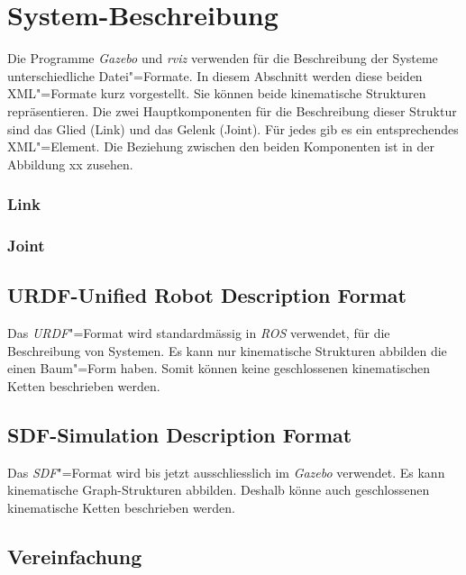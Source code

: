 \section{System-Beschreibung}

Die Programme \textit{Gazebo} und \textit{rviz} verwenden für die Beschreibung der Systeme unterschiedliche Datei"=Formate.
In diesem Abschnitt werden diese beiden XML"=Formate kurz vorgestellt.
Sie können beide kinematische Strukturen repräsentieren.
Die zwei Hauptkomponenten für die Beschreibung dieser Struktur sind das Glied (Link) und das Gelenk (Joint).
Für jedes gib es ein entsprechendes XML"=Element.
Die Beziehung zwischen den beiden Komponenten ist in der Abbildung xx zusehen. %


\subsubsection*{Link}

\subsubsection*{Joint}

\subsection{URDF-Unified Robot Description Format}
Das \textit{URDF}"=Format wird standardmässig in \textit{ROS} verwendet, für die Beschreibung von Systemen.
Es kann nur kinematische Strukturen abbilden die einen Baum"=Form haben.
Somit können keine geschlossenen kinematischen Ketten beschrieben werden.


\subsection{SDF-Simulation Description Format}
Das \textit{SDF}"=Format wird bis jetzt ausschliesslich im \textit{Gazebo} verwendet.
Es kann kinematische Graph-Strukturen abbilden.
Deshalb könne auch geschlossenen kinematische Ketten beschrieben werden.

\subsection{Vereinfachung}
